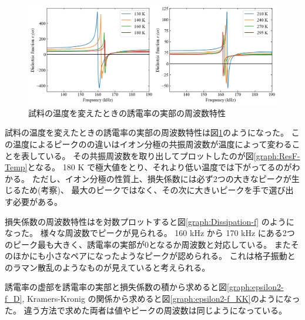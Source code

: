 \documentclass[9pt,dvipdfmx,a4paper]{jsarticle}
\begin{document}
\begin{figure}[t]
    \includegraphics[width=0.96\columnwidth]{epsilon1-f.png}
    \caption{試料の温度を変えたときの誘電率の実部の周波数特性}
    \label{graph:epsilon1-f}
\end{figure}


試料の温度を変えたときの誘電率の実部の周波数特性は図\ref{graph:epsilon1-f}のようになった。
この温度によるピークのの違いはイオン分極の共振周波数が温度によって変わることを表している。
その共振周波数を取り出してプロットしたのが図\ref{graph:ResF-Temp}となる。
180 K で極大値をとり、それより低い温度では下がってるのがわかる。
ただし、イオン分極の性質上、損失係数には必ず2つの大きなピークが生じるため(考察)、
最大のピークではなく、その次に大きいピークを手で選び出す必要がある。

損失係数の周波数特性はを対数プロットすると図\ref{graph:Dissipation-f} のようになった。
様々な周波数でピークが見られる。
160 kHz から 170 kHz にある2つのピーク最も大きく、誘電率の実部が0となるか周波数と対応している。
またそのほかにも小さなペアになったようなピークが認められる。
これは格子振動とのラマン散乱のようなものが見えていると考えられる。

誘電率の虚部を誘電率の実部と損失係数の積から求めると図\ref{graph:epsilon2-f_D},
Kramers-Kronig の関係から求めると図\ref{graph:epsilon2-f_KK}のようになった。
違う方法で求めた両者は値やピークの周波数は同じようになっている。
\end{document}
